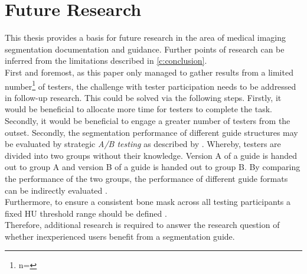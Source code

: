 \section*{Future Research}\label{c:future}
This thesis provides a basis for future research in the area of medical imaging segmentation documentation and guidance.
Further points of research can be inferred from the limitations described in \cref{c:conclusion}.\\
First and foremost, as this paper only managed to gather results from a limited number\footnote{n=\numberofTesters} of testers, 
the challenge with tester participation needs to be addressed in follow-up research.
This could be solved via the following steps.
Firstly, it would be beneficial to allocate more time for testers to complete the task.
Secondly, it would be beneficial to engage a greater number of testers from the outset.
Secondly, the segmentation performance of different guide structures may be evaluated by strategic \textit{A/B testing} as 
described by \citeauthor{brataUserExperienceImprovement2020}.
Whereby, testers are divided into two groups without their knowledge.
Version A of a guide is handed out to group A and version B of a guide is handed out to group B.
By comparing the performance of the two groups, the performance of different guide formats can be indirectly evaluated \cite{brataUserExperienceImprovement2020}.\\
Furthermore, to ensure a consistent bone mask across all testing participants a fixed HU threshold range should be defined \cite{chavezGuidelinesMicroComputed2021}.\\
Therefore, additional research is required to answer the research question of whether inexperienced users benefit from a segmentation guide.
